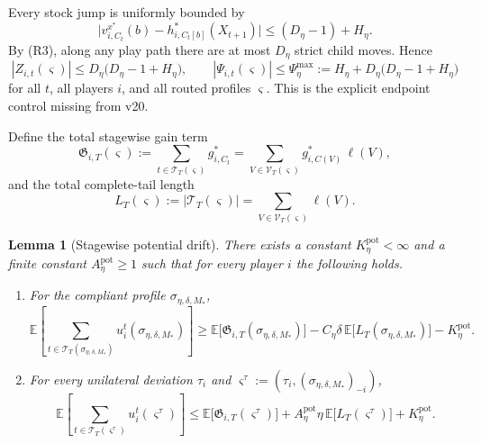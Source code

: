 \documentclass[12pt]{article}
\newtheorem{lemma}[theorem]{Lemma}
\theoremstyle{definition}
\newcommand{\E}{\mathbb{E}}
\newcommand{\1}{\mathbf{1}}
\begin{document}
Every stock jump is uniformly bounded by
\[
\bigl|v_{i,C_t}^{x^*}(b)-h_{i,C_t[b]}^*(X_{t+1})\bigr|
\le
(D_\eta-1)+H_\eta.
\]
By \textnormal{(R3)}, along any play path there are at
most $D_\eta$ strict child moves. Hence
\begin{equation}
\label{eq:psi-bound}
|Z_{i,t}(\varsigma)|
\le
D_\eta\bigl(D_\eta-1+H_\eta\bigr),
\qquad
|\Psi_{i,t}(\varsigma)|
\le
\Psi_\eta^{\max}:=
H_\eta+D_\eta\bigl(D_\eta-1+H_\eta\bigr)
\end{equation}
for all $t$, all players $i$, and all routed profiles $\varsigma$. This is the
explicit endpoint control missing from v20.

Define the total stagewise gain term
\begin{equation}
\label{eq:gain-chain-def}
\mathfrak G_{i,T}(\varsigma)
:=
\sum_{t\in\mathcal T_T(\varsigma)} g_{i,C_t}^*
=
\sum_{V\in\mathcal V_T(\varsigma)} g_{i,C(V)}^*\,\ell(V),
\end{equation}
and the total complete-tail length
\[
L_T(\varsigma):=|\mathcal T_T(\varsigma)|
=
\sum_{V\in\mathcal V_T(\varsigma)}\ell(V).
\]

\begin{lemma}[Stagewise potential drift]
\label{lem:visit-bellman}
There exists a constant $K_\eta^{\mathrm{pot}}<\infty$ and a finite constant
$A_\eta^{\mathrm{pot}}\ge 1$ such that for every player $i$ the following holds.

\begin{enumerate}[label=\textnormal{(\alph*)},leftmargin=2.8em]
\item For the compliant profile $\sigma_{\eta,\delta,M_*}$,
\begin{equation}
\label{eq:stagewise-potential-compliant}
\E\left[
\sum_{t\in\mathcal T_T(\sigma_{\eta,\delta,M_*})}
u_i^t(\sigma_{\eta,\delta,M_*})
\right]
\ge
\E\bigl[\mathfrak G_{i,T}(\sigma_{\eta,\delta,M_*})\bigr]
-
C_\eta\delta\,\E\bigl[L_T(\sigma_{\eta,\delta,M_*})\bigr]
-
K_\eta^{\mathrm{pot}}.
\end{equation}

\item For every unilateral deviation $\tau_i$ and
$\varsigma^\tau:=(\tau_i,(\sigma_{\eta,\delta,M_*})_{-i})$,
\begin{equation}
\label{eq:stagewise-potential-deviator}
\E\left[
\sum_{t\in\mathcal T_T(\varsigma^\tau)}
u_i^t(\varsigma^\tau)
\right]
\le
\E\bigl[\mathfrak G_{i,T}(\varsigma^\tau)\bigr]
+
A_\eta^{\mathrm{pot}}\eta\,
\E\bigl[L_T(\varsigma^\tau)\bigr]
+
K_\eta^{\mathrm{pot}}.
\end{equation}
\end{enumerate}
\end{lemma}
\end{document}
